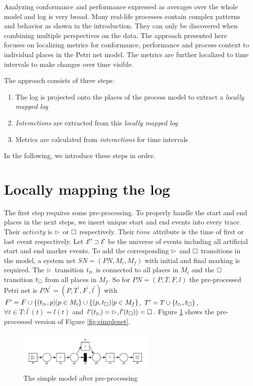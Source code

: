 Analyzing conformance and performance expressed as averages over the whole model and log is very broad. Many real-life processes contain complex patterns and behavior as shown in the introduction. They can only be discovered when combining multiple perspectives on the data. The approach presented here focuses on localizing metrics for conformance, performance and process context to individual places in the Petri net model. The metrics are further localized to time intervals to make changes over time visible.

The approach consists of three steps:
\begin{enumerate}
    \item The log is projected onto the places of the process model to extract a \emph{locally mapped log}
    \item \emph{Interactions} are extracted from this \emph{locally mapped log}
    \item Metrics are calculated from \emph{interactions} for time intervals
\end{enumerate}

In the following, we introduce these steps in order.

\section{Locally mapping the log}
The first step requires some pre-processing. To properly handle the start and end places in the next steps, we insert unique start and end events into every trace. Their $activity$ is $\rhd$ or $\square$ respectively. Their $time$ attribute is the time of first or last event respectively. Let $\mathcal{E}^\prime \supset \mathcal{E}$ be the universe of events including all artificial start and end marker events. To add the corresponding $\rhd$ and $\square$ transitions in the model, a system net $SN=(PN,M_i,M_f)$ with initial and final marking is required. The $\rhd$ transition $t_{\rhd}$ is connected to all places in $M_i$ and the $\square$ transition $t_{\square}$ from all places in $M_f$. So for $PN = (P,T,F,l)$ the pre-processed Petri net is $PN^\prime=(P,T^\prime,F^\prime,l^\prime)$ with $F^\prime = F \cup \{ (t_{\rhd},p) |p\in M_i\}\cup \{(p,t_{\square})|p \in M_f\}$, $T^\prime = T \cup \{t_{\rhd},t_{\square}\}$, $\forall t\in T: l^\prime(t)=l(t)$ and $l^\prime(t_{\rhd}) = \rhd, l^\prime(t_{\square})) = \square$. Figure \ref{fig:preprocessednet} shows the pre-processed version of Figure \ref{fig:simplenet}.

\begin{figure}
    \centering
    \includegraphics[width=0.6\textwidth]{figures/concept/preproc_simplenet.png}
    \caption{The simple model after pre-processing}
    \label{fig:preprocessednet}
\end{figure}

